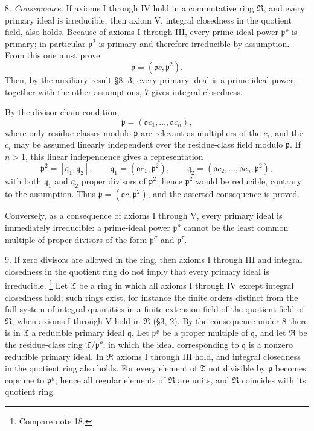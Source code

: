 \documentclass[11pt]{article}
\providecommand{\mR}{\mathfrak{R}}
\providecommand{\mT}{\mathfrak{T}}
\providecommand{\mo}{\mathfrak{o}}
\providecommand{\mpideal}{\mathfrak{p}}
\providecommand{\mq}{\mathfrak{q}}
\begin{document}
8. \emph{Consequence.} If axioms I through IV hold in a commutative ring $\mR$, and every primary ideal is irreducible, then axiom V, integral closedness in the quotient field, also holds. Because of axioms I through III, every prime-ideal power $\mpideal^\varrho$ is primary; in particular $\mpideal^2$ is primary and therefore irreducible by assumption. From this one must prove
\[
        \mpideal=(\mo c,\mpideal^2).
\]
Then, by the auxiliary result §8, 3, every primary ideal is a prime-ideal power; together with the other assumptions, 7 gives integral closedness.

By the divisor-chain condition,
\[
        \mpideal=(\mo c_1,\ldots,\mo c_n),
\]
where only residue classes modulo $\mpideal$ are relevant as multipliers of the $c_i$, and the $c_i$ may be assumed linearly independent over the residue-class field modulo $\mpideal$. If $n>1$, this linear independence gives a representation
\[
        \mpideal^2=[\mq_1,\mq_2],
        \qquad
        \mq_1=(\mo c_1,\mpideal^2),
        \qquad
        \mq_2=(\mo c_2,\ldots,\mo c_n,\mpideal^2),
\]
with both $\mq_1$ and $\mq_2$ proper divisors of $\mpideal^2$; hence $\mpideal^2$ would be reducible, contrary to the assumption. Thus $\mpideal=(\mo c,\mpideal^2)$, and the asserted consequence is proved.

Conversely, as a consequence of axioms I through V, every primary ideal is immediately irreducible: a prime-ideal power $\mpideal^\varrho$ cannot be the least common multiple of proper divisors of the form $\mpideal^\sigma$ and $\mpideal^\tau$.

9. If zero divisors are allowed in the ring, then axioms I through III and integral closedness in the quotient ring do not imply that every primary ideal is irreducible.
\footnote{Compare note 18.}
Let $\mT$ be a ring in which all axioms I through IV except integral closedness hold; such rings exist, for instance the finite orders distinct from the full system of integral quantities in a finite extension field of the quotient field of $\mR$, when axioms I through V hold in $\mR$ (§3, 2). By the consequence under 8 there is in $\mT$ a reducible primary ideal $\mq$. Let $\mpideal^\varrho$ be a proper multiple of $\mq$, and let $\mR$ be the residue-class ring $\mT/\mpideal^\varrho$, in which the ideal corresponding to $\mq$ is a nonzero reducible primary ideal. In $\mR$ axioms I through III hold, and integral closedness in the quotient ring also holds. For every element of $\mT$ not divisible by $\mpideal$ becomes coprime to $\mpideal^\varrho$; hence all regular elements of $\mR$ are units, and $\mR$ coincides with its quotient ring.
\end{document}

